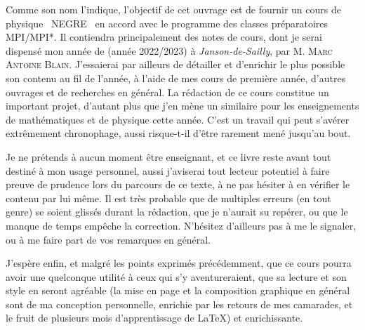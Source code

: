 \documentclass[a4paper,french,bookmarks]{book}
\begin{document}
    \newline\newline\newline
    
    \begin{center}
        \begin{minipage}{0.85\linewidth}
            \large \qquad Comme son nom l'indique, l'objectif de cet ouvrage est de fournir un cours de physique ~NEGRE~ en accord avec le programme des classes préparatoires \textsf{MPI/MPI*}. Il contiendra principalement des notes de cours, dont je serai dispensé mon année de  (année 2022/2023) à \textit{Janson-de-Sailly}, par M. \textsc{Marc Antoine Blain}. J'essaierai par ailleurs de détailler et d'enrichir le plus possible son contenu au fil de l'année, à l'aide de mes cours de première année, d'autres ouvrages et de recherches en général. La rédaction de ce cours constitue un important projet, d'autant plus que j'en mène un similaire pour les enseignements de mathématiques et de physique cette année. C'est un travail qui peut s'avérer extrêmement chronophage, aussi risque-t-il d'être rarement mené jusqu'au bout.\newline
    
            \qquad Je ne prétends à aucun moment être enseignant, et ce livre reste avant tout destiné à mon usage personnel, aussi j'aviserai tout lecteur potentiel à faire preuve de prudence lors du parcours de ce texte, à ne pas hésiter à en vérifier le contenu par lui même. Il est très probable que de multiples erreurs (en tout genre) se soient glissés durant la rédaction, que je n'aurait su repérer, ou que le manque de temps empêche la correction. N'hésitez d'ailleurs pas à me le signaler, ou à me faire part de vos remarques en général.\newline
    
            \qquad J'espère enfin, et malgré les points exprimés précédemment, que ce cours pourra avoir une quelconque utilité à ceux qui s'y aventureraient, que sa lecture et son style en seront agréable (la mise en page et la composition graphique en général sont de ma conception personnelle, enrichie par les retours de mes camarades, et le fruit de plusieurs mois d'apprentissage de \LaTeX) et enrichissante.\newline\newline\newline\text{}
        \end{minipage}
    \end{center}
    
\end{document}

